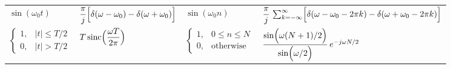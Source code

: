 \documentclass[8pt]{article}
\begin{document}
\begin{multicols}{2}
\begin{table*}[ht]
\begin{tabular}{@{}llll@{}}
            $\sin(\omega_0 t)$                                             & $\dfrac{\pi}{j}\Bigl[\delta(\omega-\omega_0) - \delta(\omega+\omega_0)\Bigr]$ & $\sin(\omega_0 n)$                                                      & $\dfrac{\pi}{j}\,\sum_{k=-\infty}^{\infty}\Bigl[\delta(\omega-\omega_0-2\pi k) - \delta(\omega+\omega_0-2\pi k)\Bigr]$ \\ [1mm]
            $\begin{cases} 1, & |t| \le T/2 \\ 0, & |t| > T/2 \end{cases}$ & $T\,\mathrm{sinc}\Bigl(\dfrac{\omega T}{2\pi}\Bigr)$                          & $\begin{cases} 1, & 0 \le n \le N \\ 0, & \text{otherwise} \end{cases}$ & $\dfrac{\sin\Bigl(\omega (N+1)/2\Bigr)}{\sin\Bigl(\omega/2\Bigr)}\,e^{-j\omega N/2}$                                   \\ [1mm]
            \bottomrule
        \end{tabular}
    \end{table*}

\end{multicols}
\end{document}

